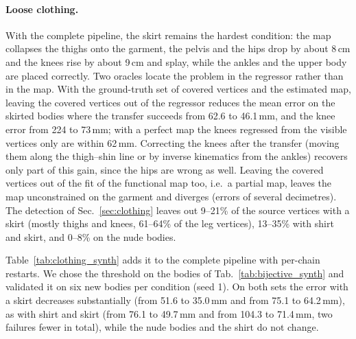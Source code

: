 \documentclass[11pt]{article}
\begin{document}
\paragraph{Loose clothing.}
With the complete pipeline, the skirt remains the hardest condition: the map
collapses the thighs onto the garment, the pelvis and the hips drop by about
8\,cm and the knees rise by about 9\,cm and splay, while the ankles and the
upper body are placed correctly. Two oracles locate the problem in the
regressor rather than in the map. With the ground-truth set of covered
vertices and the estimated map, leaving the covered vertices out of the
regressor reduces the mean error on the skirted bodies where the transfer
succeeds from 62.6 to 46.1\,mm, and the knee error from 224 to 73\,mm; with a
perfect map the knees regressed from the visible vertices only are within
62\,mm. Correcting the knees after the transfer (moving them along the
thigh--shin line or by inverse kinematics from the ankles) recovers only part
of this gain, since the hips are wrong as well. Leaving the covered vertices
out of the fit of the functional map too, i.e.\ a partial map, leaves the map
unconstrained on the garment and diverges (errors of several decimetres). The
detection of Sec.~\ref{sec:clothing} leaves out 9--21\% of the source vertices
with a skirt (mostly thighs and knees, 61--64\% of the leg vertices), 13--35\%
with shirt and skirt, and 0--8\% on the nude bodies.

Table~\ref{tab:clothing_synth} adds it to the complete pipeline with
per-chain restarts. We chose the threshold on the bodies of
Tab.~\ref{tab:bijective_synth} and validated it on six new bodies per
condition (seed 1). On both sets the error with a skirt decreases
substantially (from 51.6 to 35.0\,mm and from 75.1 to 64.2\,mm), as with shirt
and skirt (from 76.1 to 49.7\,mm and from 104.3 to 71.4\,mm, two failures
fewer in total), while the nude bodies and the shirt do not change.
\end{document}
